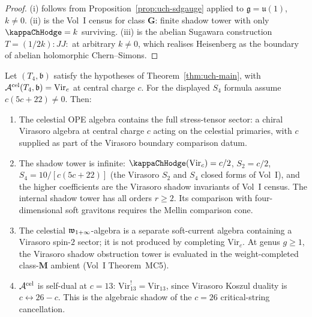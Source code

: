 \begin{proof}
(i) follows from Proposition~\ref{prop:uch-sdgauge} applied to
$\mathfrak g = \mathfrak{u}(1)$, $k \neq 0$. (ii) is the Vol~I
census for class $\mathbf G$: finite shadow tower with only
$\kap = k$ surviving. (iii) is the abelian Sugawara construction
$T = (1/2k)\!:\!JJ\!:$ at arbitrary $k \neq 0$, which realises
Heisenberg as the boundary of abelian holomorphic Chern--Simons.
\end{proof}

\begin{proposition}
\label{prop:uch-celestial-virasoro}
Let $(T_4,\mathfrak b)$ satisfy the hypotheses of
Theorem~\ref{thm:uch-main}, with
$\mathcal A^{\mathrm{cel}}(T_4,\mathfrak b) = \mathrm{Vir}_c$ at central
charge $c$. For the displayed $S_4$ formula assume
$c(5c+22)\ne0$.
Then:
\begin{enumerate}[label=\textup{(\roman*)}]
\item The celestial OPE algebra contains the full stress-tensor
sector: a chiral Virasoro algebra at central charge $c$ acting on
the celestial primaries, with \(c\) supplied as part of the Virasoro
boundary comparison datum.
\item The shadow tower is infinite: $\kap(\mathrm{Vir}_c) = c/2$,
$S_2 = c/2$, $S_4 = 10/[c(5c + 22)]$ (the Virasoro $S_2$ and
$S_4$ closed forms of Vol~I), and the higher
coefficients are the Virasoro shadow invariants of Vol~I census. The
internal shadow tower has all orders \(r \geq 2\). Its comparison with
four-dimensional soft gravitons requires the Mellin comparison cone.
\item The celestial \(\mathfrak w_{1+\infty}\)-algebra is a separate soft-current algebra
containing a Virasoro spin-\(2\) sector; it is not produced by
completing \(\mathrm{Vir}_c\). At genus \(g \geq 1\), the Virasoro
shadow obstruction tower is evaluated in the weight-completed
class-\(\mathbf M\) ambient (Vol~I Theorem~MC5).
\item $\mathcal A^{\mathrm{cel}}$ is self-dual at $c = 13$:
$\mathrm{Vir}_{13}^{!} = \mathrm{Vir}_{13}$, since Virasoro Koszul
duality is $c \leftrightarrow 26 - c$. This is the algebraic shadow
of the
$c = 26$ critical-string cancellation.
\end{enumerate}
\end{proposition}


